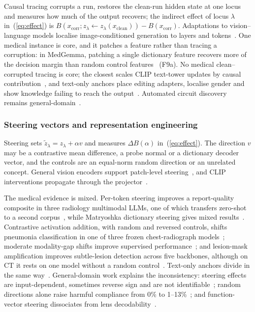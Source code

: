 Causal tracing corrupts a run, restores the clean-run hidden state at one locus and measures how much
of the output recovers; the indirect effect of locus $\lambda$ in~(\ref{eq:effect}) is
$B(x_{\mathrm{corr}};z_\lambda\!\leftarrow\!z_\lambda(x_{\mathrm{clean}}))-B(x_{\mathrm{corr}})$.
Adaptations to vision--language models localise image-conditioned generation to layers and
tokens~\cite{palit2023towards,basu2024understanding,zhang2024cross,li2025causal}. One medical instance
is core, and it patches a feature rather than tracing a corruption: in MedGemma, patching a single
dictionary feature recovers more of the decision margin than random control
features~\cite{sadanandan2026mechanistically} (F9a). No medical clean--corrupted tracing is core; the
closest scales CLIP text-tower updates by causal contribution~\cite{abbasi2026layerspecific}, and
text-only anchors place editing adapters, localise gender and show knowledge failing to reach the
output~\cite{xu2024editing,ahsan2025elucidating,abouzahir2026bridging}. Automated circuit discovery
remains general-domain~\cite{conmy2023automated,syed2023attribution,marks2024sparse,ameisen2025circuit}.

\subsubsection{Steering vectors and representation engineering}

Steering sets $\tilde z_\lambda=z_\lambda+\alpha v$ and measures $\Delta B(\alpha)$
in~(\ref{eq:effect}). The direction $v$ may be a contrastive mean difference, a probe normal or a
dictionary decoder vector, and the controls are an equal-norm random direction or an unrelated concept.
General vision encoders support patch-level steering~\cite{joseph2025steering,stevens2025interpretable},
and CLIP interventions propagate through the projector~\cite{pach2025sparse}.

The medical evidence is mixed. Per-token steering improves a report-quality composite in three radiology
multimodal LLMs, one of which transfers zero-shot to a second corpus~\cite{nooralahzadeh2026universal},
while Matryoshka dictionary steering gives mixed results~\cite{bouzid2025insights}. Contrastive
activation addition, with random and reversed controls, shifts pneumonia classification in one of three
frozen chest-radiograph models~\cite{farina2026translating}; moderate modality-gap shifts improve
supervised performance~\cite{restrepo2026cone}; and lesion-mask amplification improves subtle-lesion
detection across five backbones, although on CT it rests on one model without a random
control~\cite{zeng2026easylens}. Text-only anchors divide in the same
way~\cite{basu2026interpretability,vankadaru2026readable,ahsan2025can,ray2026do}. General-domain work
explains the inconsistency: steering effects are input-dependent, sometimes reverse sign and are not
identifiable~\cite{tan2024steeringreliability,braun2025understanding,venkatesh2026nonident}; random
directions alone raise harmful compliance from 0\% to 1--13\%~\cite{korznikov2025the,li2026analysing};
and function-vector steering dissociates from lens decodability~\cite{nadaf2026steerable}.

